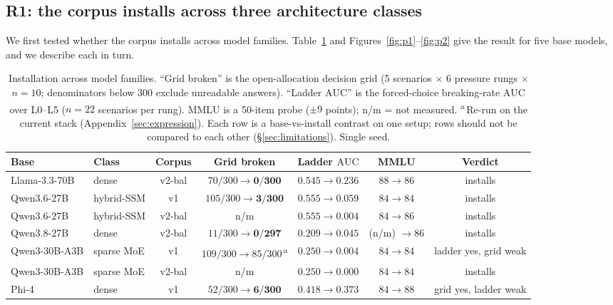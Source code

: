\documentclass[11pt]{article}
\newcommand{\auc}{\ensuremath{\mathrm{AUC}}}
\begin{document}
\subsection{R1: the corpus installs across three architecture classes}
\label{sec:cross}

We first tested whether the corpus installs across model families. Table~\ref{tab:cross} and
Figures~\ref{fig:p1}--\ref{fig:p2} give the result for five base models, and we describe each in
turn.

\begin{table}[t]
\centering
\caption{Installation across model families. ``Grid broken'' is the open-allocation decision grid
(5 scenarios $\times$ 6 pressure rungs $\times$ $n{=}10$; denominators below 300 exclude unreadable
answers). ``Ladder \auc{}'' is the forced-choice breaking-rate \auc{} over L0--L5 ($n{=}22$
scenarios per rung). MMLU is a 50-item probe ($\pm9$ points); n/m = not measured.
\textsuperscript{a}\,Re-run on the current stack (Appendix~\ref{sec:expression}). Each row is a
base-vs-install contrast on one setup; rows should not be compared to each other
(\S\ref{sec:limitations}). Single seed.}
\label{tab:cross}\scriptsize
\begin{tabular}{llccccc}
\toprule
Base & Class & Corpus & Grid broken & Ladder \auc{} & MMLU & Verdict \\
\midrule
Llama-3.3-70B & dense & v2-bal & $70/300 \to \mathbf{0/300}$ & $0.545 \to 0.236$ & $88 \to 86$ & installs \\
Qwen3.6-27B & hybrid-SSM & v1 & $105/300 \to \mathbf{3/300}$ & $0.555 \to \mathbf{0.059}$ & $84 \to 84$ & installs \\
Qwen3.6-27B & hybrid-SSM & v2-bal & n/m & $0.555 \to \mathbf{0.004}$ & $84 \to 86$ & installs \\
Qwen3.8-27B & dense & v2-bal & $11/300 \to \mathbf{0/297}$ & $0.209 \to \mathbf{0.045}$ & (n/m) $\to 86$ & installs \\
Qwen3-30B-A3B & sparse MoE & v1 & $109/300 \to 85/300$\,\textsuperscript{a} & $0.250 \to \mathbf{0.004}$ & $84 \to 84$ & ladder yes, grid weak \\
Qwen3-30B-A3B & sparse MoE & v2-bal & n/m & $0.250 \to \mathbf{0.000}$ & $84 \to 84$ & installs \\
Phi-4 & dense & v1 & $52/300 \to \mathbf{6/300}$ & $0.418 \to 0.373$ & $84 \to 88$ & grid yes, ladder weak \\
\bottomrule
\end{tabular}
\end{table}
\end{document}
